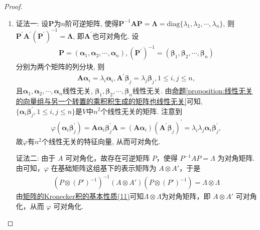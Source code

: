 \documentclass[../../main.tex]{subfiles}
\begin{document}
\begin{proof}
\begin{enumerate}
\item {\color{blue}证法一:}
设\(\boldsymbol{P}\)为\(n\)阶可逆矩阵, 使得\(\boldsymbol{P}^{-1}\boldsymbol{AP}=\boldsymbol{\Lambda}=\mathrm{diag}\{\lambda_{1},\lambda_{2},\cdots,\lambda_{n}\}\), 则\(\boldsymbol{P}^{\prime}\boldsymbol{A}^{\prime}(\boldsymbol{P}^{\prime})^{-1}=\boldsymbol{\Lambda}\), 即\(\boldsymbol{A}^{\prime}\)也可对角化. 设
\begin{align*}
\boldsymbol{P}=(\boldsymbol{\alpha}_{1},\boldsymbol{\alpha}_{2},\cdots,\boldsymbol{\alpha}_{n}), (\boldsymbol{P}^{\prime})^{-1}=(\boldsymbol{\beta}_{1},\boldsymbol{\beta}_{2},\cdots,\boldsymbol{\beta}_{n})
\end{align*}
分别为两个矩阵的列分块, 则
\begin{align*}
\boldsymbol{A}\boldsymbol{\alpha}_{i}=\lambda_{i}\boldsymbol{\alpha}_{i}, \boldsymbol{A}^{\prime}\boldsymbol{\beta}_{j}=\lambda_{j}\boldsymbol{\beta}_{j}, 1\leq i,j\leq n,
\end{align*}
且\(\boldsymbol{\alpha}_{1},\boldsymbol{\alpha}_{2},\cdots,\boldsymbol{\alpha}_{n}\)线性无关, \(\boldsymbol{\beta}_{1},\boldsymbol{\beta}_{2},\cdots,\boldsymbol{\beta}_{n}\)线性无关. 由\hyperref[proposition:线性无关的向量组与另一个转置的乘积积生成的矩阵也线性无关]{命题\ref{proposition:线性无关的向量组与另一个转置的乘积积生成的矩阵也线性无关}}可知, \(\{\boldsymbol{\alpha}_{i}\boldsymbol{\beta}_{j}^{\prime},1\leq i,j\leq n\}\)是\(V\)中\(n^{2}\)个线性无关的矩阵. 注意到
\begin{align*}
\varphi(\boldsymbol{\alpha}_{i}\boldsymbol{\beta}_{j}^{\prime})=\boldsymbol{A}\boldsymbol{\alpha}_{i}\boldsymbol{\beta}_{j}^{\prime}\boldsymbol{A}=(\boldsymbol{A}\boldsymbol{\alpha}_{i})(\boldsymbol{A}^{\prime}\boldsymbol{\beta}_{j})^{\prime}=\lambda_{i}\lambda_{j}\boldsymbol{\alpha}_{i}\boldsymbol{\beta}_{j}^{\prime},
\end{align*}
故\(\varphi\)有\(n^{2}\)个线性无关的特征向量, 从而可对角化. 

{\color{blue}证法二:}
由于 $A$ 可对角化，故存在可逆矩阵 $P$，使得 $P^{-1}AP = \varLambda$ 为对角矩阵. 由可知，$\varphi$ 在基础矩阵这组基下的表示矩阵为 $A\otimes A'$，于是
\begin{align*}
(P\otimes (P')^{-1})^{-1}(A\otimes A')(P\otimes (P')^{-1})=\varLambda\otimes\varLambda
\end{align*}
由\hyperref[矩阵的Kronecker积的基本性质(11)]{矩阵的Kronecker积的基本性质(11)}可知$\varLambda\otimes\varLambda$为对角矩阵，即 $A\otimes A'$ 可对角化，从而 $\varphi$ 可对角化. 


\end{enumerate}
\end{proof}
\end{document}
